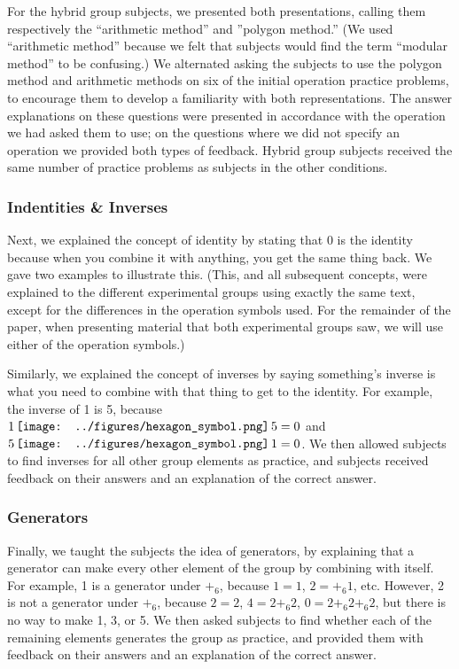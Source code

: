 \documentclass[man,10pt]{apa6}
\newcommand{\hex}{\,\vcenter{\hbox{\texttt{[image: ../figures/hexagon\_symbol.png]}}}\,}
\begin{document}
For the hybrid group subjects, we presented both presentations, calling them respectively the ``arithmetic method'' and ''polygon method.'' (We used ``arithmetic method'' because we felt that subjects would find the term ``modular method'' to be confusing.) We alternated asking the subjects to use the polygon method and arithmetic methods on six of the initial operation practice problems, to encourage them to develop a familiarity with both representations. The answer explanations on these questions were presented in accordance with the operation we had asked them to use; on the questions where we did not specify an operation we provided both types of feedback. Hybrid group subjects received the same number of practice problems as subjects in the other conditions. 
\subsubsection{Indentities \& Inverses}
Next, we explained the concept of identity by stating that 0 is the identity because when you combine it with anything, you get the same thing back. We gave two examples to illustrate this. (This, and all subsequent concepts, were explained to the different experimental groups using exactly the same text, except for the differences in the operation symbols used. For the remainder of the paper, when presenting material that both experimental groups saw, we will use either of the operation symbols.)\par
Similarly, we explained the concept of inverses by saying something's inverse is what you need to combine with that thing to get to the identity. For example, the inverse of 1 is 5, because $1 \hex 5 = 0$ and $5 \hex 1 = 0$. We then allowed subjects to find inverses for all other group elements as practice, and subjects received feedback on their answers and an explanation of the correct answer.
\subsubsection{Generators}
Finally, we taught the subjects the idea of generators, by explaining that a generator can make every other element of the group by combining with itself. For example, 1 is a generator under $+_6$, because $1 = 1$, $2 = +_6 1$, etc. However, 2 is not a generator under $+_6$, because $2 = 2$, $4 = 2 +_6 2$, $0 = 2 +_6 2 +_6 2$, but there is no way to make 1, 3, or 5. We then asked subjects to find whether each of the remaining elements generates the group as practice, and provided them with feedback on their answers and an explanation of the correct answer.
\end{document}
